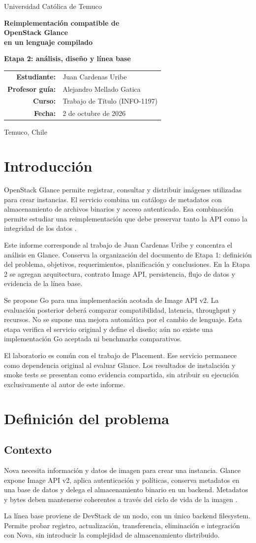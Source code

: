 \documentclass[12pt,a4paper]{article}
\newcommand{\reportcover}{
\hypersetup{pageanchor=false}
\begin{titlepage}\centering
\vspace*{0.3cm}
{\Large Universidad Católica de Temuco\par}
\vspace{0.2cm}{\large Ingeniería Civil en Informática\par}
\vspace{2cm}
{\LARGE\bfseries Reimplementación compatible de\\OpenStack Glance\\en un lenguaje compilado\par}
\vspace{0.65cm}
{\large\bfseries Etapa 2: análisis, diseño y línea base\par}
\vspace{1.8cm}
\begin{tabular}{rl}
\textbf{Estudiante:}&Juan Cardenas Uribe\\[0.35cm]
\textbf{Profesor guía:}&Alejandro Mellado Gatica\\[0.35cm]
\textbf{Curso:}&Trabajo de Título (INFO-1197)\\[0.35cm]
\textbf{Fecha:}&2 de octubre de 2026
\end{tabular}
\vfill Temuco, Chile
\end{titlepage}
\pagenumbering{arabic}\hypersetup{pageanchor=true}\begingroup\small\setlength{\parskip}{0pt}\tableofcontents\endgroup\newpage}
\begin{document}
\reportcover

\section{Introducción}
OpenStack Glance permite registrar, consultar y distribuir imágenes utilizadas para crear instancias. El servicio combina un catálogo de metadatos con almacenamiento de archivos binarios y acceso autenticado. Esa combinación permite estudiar una reimplementación que debe preservar tanto la API como la integridad de los datos \cite{glanceoverview,glanceapi}.

Este informe corresponde al trabajo de Juan Cardenas Uribe y concentra el análisis en Glance. Conserva la organización del documento de Etapa 1: definición del problema, objetivos, requerimientos, planificación y conclusiones. En la Etapa 2 se agregan arquitectura, contrato Image API, persistencia, flujo de datos y evidencia de la línea base.

Se propone Go para una implementación acotada de Image API v2. La evaluación posterior deberá comparar compatibilidad, latencia, throughput y recursos. No se supone una mejora automática por el cambio de lenguaje. Esta etapa verifica el servicio original y define el diseño; aún no existe una implementación Go aceptada ni benchmarks comparativos.

El laboratorio es común con el trabajo de Placement. Ese servicio permanece como dependencia original al evaluar Glance. Los resultados de instalación y smoke tests se presentan como evidencia compartida, sin atribuir su ejecución exclusivamente al autor de este informe.

\section{Definición del problema}
\subsection{Contexto}
Nova necesita información y datos de imagen para crear una instancia. Glance expone Image API v2, aplica autenticación y políticas, conserva metadatos en una base de datos y delega el almacenamiento binario en un backend. Metadatos y bytes deben mantenerse coherentes a través del ciclo de vida de la imagen \cite{glanceapi,glanceoverview}.

La línea base proviene de DevStack de un nodo, con un único backend filesystem. Permite probar registro, actualización, transferencia, eliminación e integración con Nova, sin introducir la complejidad de almacenamiento distribuido.
\end{document}

